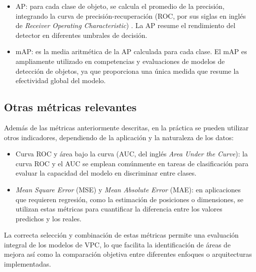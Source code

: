 \begin{itemize}
	\item AP: para cada clase de objeto, se calcula el promedio de la precisión, integrando la curva de precisión-recuperación (ROC, por sus siglas en inglés de \textit{Receiver Operating Characteristic}) \citep{wikipedia_curva_2025}. La AP resume el rendimiento del detector en diferentes umbrales de decisión.
	\item mAP: es la media aritmética de la AP calculada para cada clase. El mAP es ampliamente utilizado en competencias y evaluaciones de modelos de detección de objetos, ya que proporciona una única medida que resume la efectividad global del modelo.
\end{itemize}

\subsection{Otras métricas relevantes}

Además de las métricas anteriormente descritas, en la práctica se pueden utilizar otros indicadores, dependiendo de la aplicación y la naturaleza de los datos:
\begin{itemize}
	\item Curva ROC y área bajo la curva (AUC, del inglés \textit{Area Under the Curve}): la curva ROC y el AUC se emplean comúnmente en tareas de clasificación para evaluar la capacidad del modelo en discriminar entre clases.
	\item \textit{Mean Square Error} (MSE) y \textit{Mean Absolute Error} (MAE): en aplicaciones que requieren regresión, como la estimación de posiciones o dimensiones, se utilizan estas métricas para cuantificar la diferencia entre los valores predichos y los reales.
\end{itemize}

La correcta selección y combinación de estas métricas permite una evaluación integral de los modelos de VPC, lo que facilita la identificación de áreas de mejora así como la comparación objetiva entre diferentes enfoques o arquitecturas implementadas.